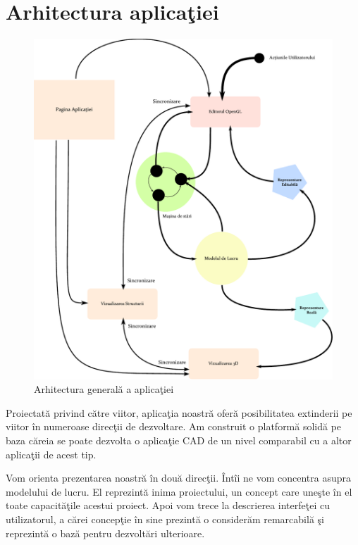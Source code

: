 \chapter{Arhitectura aplicaţiei}
\label{chapter:arh}

\begin{figure}[htp]
\begin{center} 
\includegraphics[width=\textwidth]{figures/arh-svg.pdf} \caption{Arhitectura
generală a aplicaţiei}
  \label{figure:arh}
\end{center}
\end{figure}

Proiectată privind către viitor, aplicaţia noastră oferă posibilitatea 
extinderii pe viitor în numeroase direcţii de dezvoltare. Am construit o 
platformă solidă pe baza căreia se poate dezvolta o aplicaţie CAD de un nivel 
comparabil cu a altor aplicaţii de acest tip.

Vom orienta prezentarea noastră în două direcţii. Întîi ne vom concentra asupra 
modelului de lucru. El reprezintă inima proiectului, un concept care uneşte în 
el toate capacităţile acestui proiect. Apoi vom trece la descrierea interfeţei 
cu utilizatorul, a cărei concepţie în sine prezintă o considerăm remarcabilă şi 
reprezintă o bază pentru dezvoltări ulterioare.

